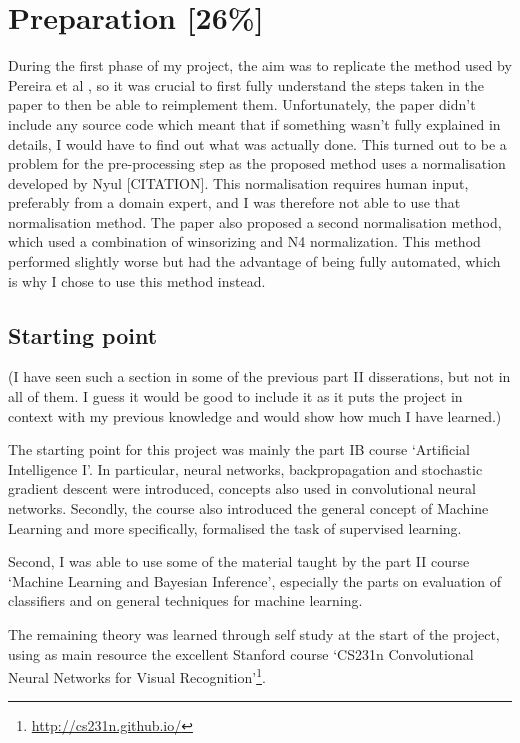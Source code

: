 \documentclass[12pt,a4paper,twoside,openright]{report}
\begin{document}
\chapter{Preparation [26\%]}
During the first phase of my project, the aim was to replicate the method used by Pereira et al \cite{pereira}, so it was crucial to first fully understand the steps taken in the paper to then be able to reimplement them. Unfortunately, the paper didn't include any source code which meant that if something wasn't fully explained in details, I would have to find out what was actually done. This turned out to be a problem for the pre-processing step as the proposed method uses a normalisation developed by Nyul [CITATION]. This normalisation requires human input, preferably from a domain expert, and I was therefore not able to use that normalisation method. The paper also proposed a second normalisation method, which used a combination of winsorizing and N4 normalization. This method performed slightly worse but had the advantage of being fully automated, which is why I chose to use this method instead.\\

\section{Starting point}
(I have seen such a section in some of the previous part II disserations, but not in all of them. I guess it would be good to include it as it puts the project in context with my previous knowledge and would show how much I have learned.)

The starting point for this project was mainly the part IB course `Artificial Intelligence I'. In particular, neural networks, backpropagation and stochastic gradient descent were introduced, concepts also used in convolutional neural networks. Secondly, the course also introduced the general concept of Machine Learning and more specifically, formalised the task of supervised learning.

Second, I was able to use some of the material taught by the part II course `Machine Learning and Bayesian Inference', especially the parts on evaluation of classifiers and on general techniques for machine learning.

The remaining theory was learned through self study at the start of the project, using as main resource the excellent Stanford course `CS231n Convolutional Neural Networks for Visual Recognition'\footnote{\url{http://cs231n.github.io/}}.
\end{document}
